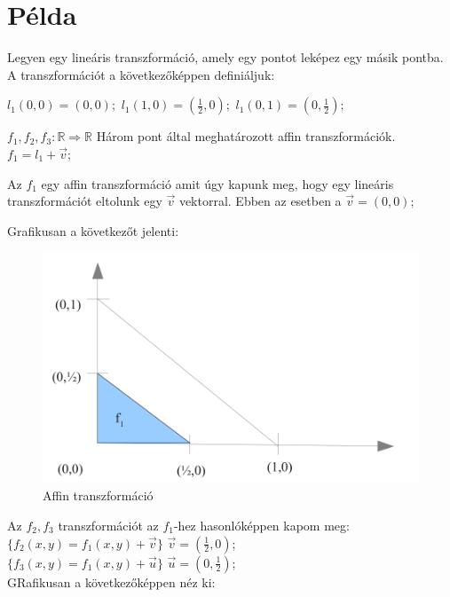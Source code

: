 \section{Példa}
Legyen egy lineáris transzformáció, amely egy pontot leképez egy másik pontba. A transzformációt a  következőképpen definiáljuk:

$l_{1}(0,0)=(0,0);$ $l_{1}(1,0)=(\frac{1}{2},0);$ $l_{1}(0,1)=(0,\frac{1}{2});$

$f_{1}, f_{2}, f_{3}: \mathbb{R} \Rightarrow \mathbb{R}$ Három pont által meghatározott affin transzformációk. \\
$f_{1}=l_{1}+\vec{v};$

Az $f_{1}$ egy affin transzformáció amit úgy kapunk meg, hogy egy lineáris transzformációt eltolunk egy $\vec{v}$ vektorral. Ebben az esetben a $\vec{v}=(0,0);$

\newpage

Grafikusan a következőt jelenti:

\begin{figure}[H]
	\centering	
	\includegraphics[scale=0.35]{Images/Grafikon1}
	\caption{Affin transzformáció}
\end{figure}

Az $f_{2}, f_{3}$ transzformációt az $f_1$-hez hasonlóképpen kapom meg:\\

$\{f_{2}(x,y)=f_{1}(x,y)+\vec{v}\}$ $\vec{v}=(\frac{1}{2},0)$; \\
\indent$\{f_{3}(x,y)=f_{1}(x,y)+\vec{u}\}$ $\vec{u}=(0,\frac{1}{2})$; \\

GRafikusan a következőképpen néz ki:

